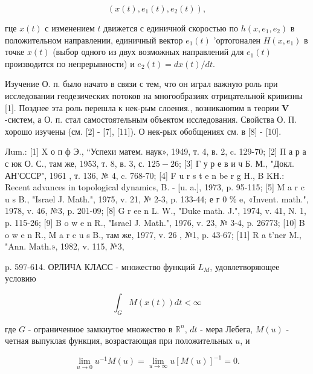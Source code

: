 \documentclass[10pt]{article}
\begin{document}
\[

\left(x(t), e_{1}(t), e_{2}(t)\right),

\]



гце $x(t)$ с изменением $t$ движется с единичной скоростью по $h\left(x, e_{1}, e_{2}\right)$ в положительном направлении, единичный вектор $e_{1}(t)$ 'ортогонален $H\left(x, e_{1}\right)$ в точке $x(t)$ (выбор одного из двух возможных направлений для $e_{1}(t)$ производится по непрерывности) и $e_{2}(t)=d x(t) / d t$.



Изучение О. п. было начато в связи с тем, что он играл важную роль при исследовании геодезических потоков на многообразиях отрицательной кривизны [1]. Позднее эта роль перешла к нек-рым слоения., возникаюпим в теории $\boldsymbol{V}$-систем, а О. п. стал самостоятельным объектом исследования. Свойства О. П. хорошо изучены (см. [2] - [7], [11]). О нек-рых обобщениях см. в [8] - [10].



Лum.: [1] X о п ф Э., “Успехи матем. наук», 1949, т. 4, в. 2, c. 129-70; [2] П а р а с юк О. С., там же, 1953, т. 8, в. 3, с. $125-26$; [3] Г у р е в и ч Б. М., "Докл. АН'СССР", 1961 , т. 136, № 4, c. 768-70; [4] F u r s t e n be r g H., B KH.: Recent advances in topological dynamics, B. - [u. a.], 1973, p. 95-115; [5] M a r c u s B., "Israel J. Math.", 1975, v. 21, № 2-3, p. 133-44; е г 0 \% e, «Invent. math.", 1978, v. 46, №3, p. 201-09; [8] G r ee n L. W., "Duke math. J.", 1974, v. 41, N. 1, p. 115-26; [9] B o w e n R., "Israel J. Math.", 1976, v. 23, № 3-4, p. 26773; [10] B o w e n R., M a r c u s B., там же, 1977, v. 26 , №1, p. 43-67; [11] R a t'ner M., "Ann. Math.», 1982, v. 115, №3,

p. 597-614. ОРЛИЧА КЛАСС - множество функций $L_{M}$, удовлетворяющее условию



\[

\int_{G} M(x(t)) d t<\infty

\]



где $G$ - ограниченное замкнутое множество в $\mathbb{R}^{n}$, $d t$ - мера Лебега, $M(u)$ - четная выпуклая функция, возрастающая при положительных $u$, и



\[

\lim _{u \rightarrow 0} u^{-1} M(u)=\lim _{u \rightarrow \infty} u[M(u)]^{-1}=0 .

\]
\end{document}
